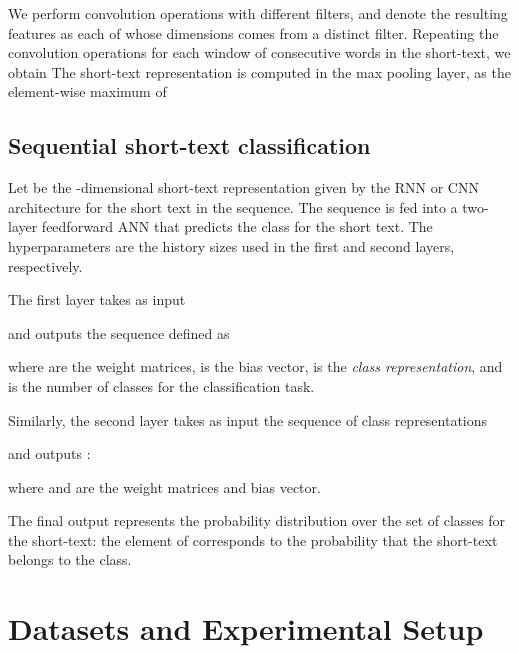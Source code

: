 \documentclass[11pt,letterpaper]{article}
\begin{document}
We perform convolution operations with  different filters, and denote the resulting features as  each of whose dimensions comes from a distinct filter. 
Repeating the convolution operations for each window of  consecutive words in the short-text, we obtain 
The short-text representation  is computed in the max pooling layer, as the element-wise maximum of 




\subsection{Sequential short-text classification} \label{sec:sequential}


Let  be the -dimensional short-text representation given by the RNN or CNN architecture for the  short text in the sequence.
The sequence 
is fed into a two-layer feedforward ANN that predicts the class for the  short text. The hyperparameters  are the history sizes used in the first and second layers, respectively.
 

The first layer takes as input
 
and outputs the sequence
 defined as
\vspace{-0.2cm}
\vspace{-0.2cm}

\noindent where  are the weight matrices, 
 is the bias vector,
 is the \textit{class representation}, 
and  is the number of classes for the classification task.


Similarly, the second layer takes as input the sequence of class representations 
  
 and outputs :
 \vspace{-0.3cm}
 \vspace{-0.3cm}

\noindent where  and  are the weight matrices and bias vector.

The final output  represents the probability distribution over the set of  classes for the  short-text: the  element of  corresponds to the probability that the  short-text belongs to the  class.  


 
\section{Datasets and Experimental Setup}
\end{document}
